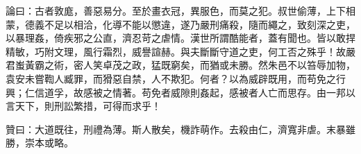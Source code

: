 \begin{pinyinscope}
論曰：古者敦庬，善惡易分。至於畫衣冠，異服色，而莫之犯。叔世偷薄，上下相蒙，德義不足以相洽，化導不能以懲違，遂乃嚴刑痛殺，隨而繩之，致刻深之吏，以暴理姦，倚疾邪之公直，濟忍苛之虐情。漢世所謂酷能者，蓋有聞也。皆以敢捍精敏，巧附文理，風行霜烈，威譽諠赫。與夫斷斷守道之吏，何工否之殊乎！故嚴君蚩黃霸之術，密人笑卓茂之政，猛既窮矣，而猶或未勝。然朱邑不以笞辱加物，袁安未嘗鞫人臧罪，而猾惡自禁，人不欺犯。何者？以為威辟既用，而苟免之行興；仁信道孚，故感被之情著。苟免者威隙則姦起，感被者人亡而思存。由一邦以言天下，則刑訟繁措，可得而求乎！

贊曰：大道既往，刑禮為薄。斯人散矣，機詐萌作。去殺由仁，濟寬非虐。末暴雖勝，崇本或略。


\end{pinyinscope}
